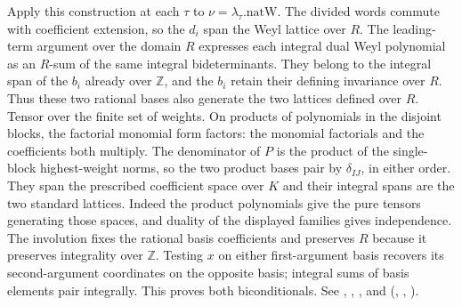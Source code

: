 Apply this construction at each $\tau$ to $\nu=\lambda_\tau.\mathrm{natW}$.
The divided words commute with coefficient extension, so the $d_i$
span the Weyl lattice over $R$. The leading-term argument over the
domain $R$ expresses each integral dual Weyl polynomial as an $R$-sum
of the same integral bideterminants. They belong to the integral span
of the $b_i$ already over $\mathbb Z$, and the $b_i$ retain their
defining invariance over $R$. Thus these two rational bases also generate
the two lattices defined over $R$. Tensor over the finite set of weights.
On products of polynomials in the disjoint blocks, the factorial monomial
form factors: the monomial factorials and the coefficients both multiply.
The denominator of $P$ is the product of the single-block highest-weight
norms, so the two product bases pair by $\delta_{IJ}$, in either order.
They span the prescribed coefficient space over $K$ and their integral
spans are the two standard lattices. Indeed the product polynomials
give the pure tensors generating those spaces, and duality of the
displayed families gives independence. The involution fixes the rational
basis coefficients and preserves $R$ because it preserves integrality
over $\mathbb Z$. Testing $x$ on either first-argument basis recovers
its second-argument coordinates on the opposite basis; integral sums
of basis elements pair integrally. This proves both biconditionals.
See , , , and
 (,
,
).


